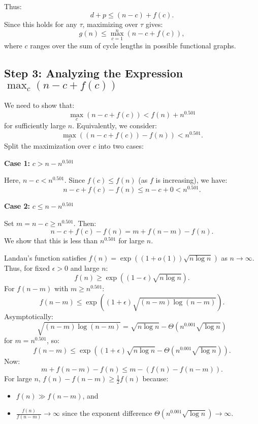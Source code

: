 \documentclass[12pt,a4paper]{article}
\theoremstyle{definition}
\begin{document}
    Thus:
    \[
        d + p \leq (n - c) + f(c).
    \]
    Since this holds for any $\tau$, maximizing over $\tau$ gives:
    \[
        g(n) \leq \max_{c=1}^n \left( n - c + f(c) \right),
    \]
    where $c$ ranges over the sum of cycle lengths in possible functional graphs.

    \subsection*{Step 3: Analyzing the Expression $\max_c (n - c + f(c))$}
    We need to show that:
    \[
        \max_c (n - c + f(c)) < f(n) + n^{0.501}
    \]
    for sufficiently large $n$. Equivalently, we consider:
    \[
        \max_c \left( (n - c + f(c)) - f(n) \right) < n^{0.501}.
    \]
    Split the maximization over $c$ into two cases:

    \textbf{Case 1:} $c > n - n^{0.501}$

    Here, $n - c < n^{0.501}$. Since $f(c) \leq f(n)$ (as $f$ is increasing), we have:
    \[
        n - c + f(c) - f(n) \leq n - c + 0 < n^{0.501}.
    \]

    \textbf{Case 2:} $c \leq n - n^{0.501}$

    Set $m = n - c \geq n^{0.501}$. Then:
    \[
        n - c + f(c) - f(n) = m + f(n - m) - f(n).
    \]
    We show that this is less than $n^{0.501}$ for large $n$.

    Landau's function satisfies $f(n) = \exp\left((1 + o(1)) \sqrt{n \log n}\right)$ as $n \to \infty$. Thus, for fixed $\epsilon > 0$ and large $n$:
    \[
        f(n) \geq \exp\left((1 - \epsilon) \sqrt{n \log n}\right).
    \]
    For $f(n - m)$ with $m \geq n^{0.501}$:
    \[
        f(n - m) \leq \exp\left((1 + \epsilon) \sqrt{(n - m) \log (n - m)}\right).
    \]
    Asymptotically:
    \[
        \sqrt{(n - m) \log (n - m)} = \sqrt{n \log n} - \Theta\left(n^{0.001} \sqrt{\log n}\right)
    \]
    for $m = n^{0.501}$, so:
    \[
        f(n - m) \leq \exp\left((1 + \epsilon) \sqrt{n \log n} - \Theta\left(n^{0.001} \sqrt{\log n}\right)\right).
    \]
    Now:
    \[
        m + f(n - m) - f(n) \leq m - \left( f(n) - f(n - m) \right).
    \]
    For large $n$, $f(n) - f(n - m) \geq \frac{1}{2} f(n)$ because:
    \begin{itemize}
        \item $f(n) \gg f(n - m)$, and
        \item $\frac{f(n)}{f(n - m)} \to \infty$ since the exponent difference $\Theta\left(n^{0.001} \sqrt{\log n}\right) \to \infty$.
    \end{itemize}
\end{document}
